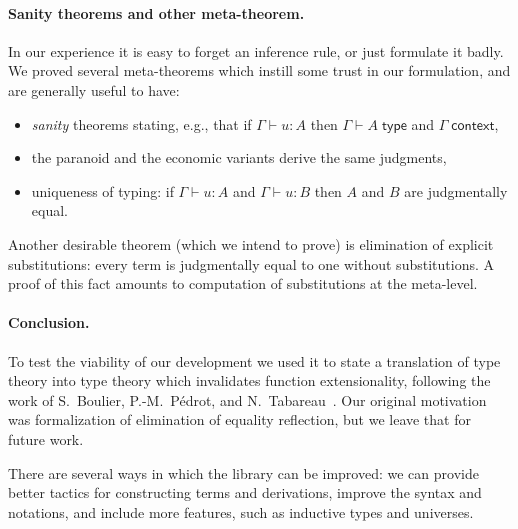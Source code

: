 \documentclass{easychair}
\newcommand{\ctx}{\Gamma}
\newcommand{\isctx}{\ctx\;\mathsf{context}}
\newcommand{\istype}[1]{\ctx \vdash #1 \;\mathsf{type}}
\newcommand{\isterm}[2]{\ctx \vdash #1 : #2}
\begin{document}
\paragraph*{Sanity theorems and other meta-theorem.}
\label{sec:sanity-theorems}

In our experience it is easy to forget an inference rule, or just formulate it badly. We
proved several meta-theorems which instill some trust in our formulation, and are
generally useful to have:
%
\begin{itemize}
\item \emph{sanity} theorems stating, e.g., that if $\isterm{u}{A}$ then $\istype{A}$ and $\isctx$,
\item the paranoid and the economic variants derive the same judgments,
\item uniqueness of typing: if $\isterm{u}{A}$ and $\isterm{u}{B}$ then $A$ and $B$ are
  judgmentally equal.
\end{itemize}
%
Another desirable theorem (which we intend to prove) is elimination of explicit
substitutions: every term is judgmentally equal to one without substitutions. A proof of
this fact amounts to computation of substitutions at the meta-level.



\paragraph*{Conclusion.}

To test the viability of our development we used it to state a translation of type theory
into type theory which invalidates function extensionality, following the work of
S.~Boulier, P.-M.~Pédrot, and N.~Tabareau~\cite{boulier17:_next_syntac_model_type_theor}.
Our original motivation was formalization of elimination of equality reflection, but we
leave that for future work.

There are several ways in which the library can be improved: we can provide better tactics
for constructing terms and derivations, improve the syntax and notations, and include more
features, such as inductive types and universes.





\end{document}
